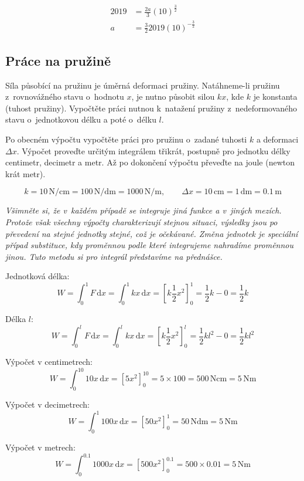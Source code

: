 $$\begin{aligned}
  2019&=\frac {2a}{3}(10)^{\frac 32}\\
  a&=\frac 32 2019 (10)^{-\frac 32}\end{aligned}$$

\konec

\stranka

\subsection{Práce na pružině} Síla působící na pružinu je úměrná
deformaci pružiny. Natáhneme-li pružinu z rovnovážného stavu o hodnotu
$x$, je nutno působit silou $kx$, kde $k$ je konstanta (tuhost
pružiny). Vypočtěte práci nutnou k natažení pružiny z nedeformovaného
stavu o jednotkovou délku a poté o délku $l$.

Po obecném výpočtu vypočtěte práci pro pružinu o zadané tuhosti $k$ a
deformaci $\Delta x$. Výpočet proveďte určitým integrálem třikrát,
postupně pro jednotku délky centimetr, decimetr a metr. Až po
dokončení výpočtu převeďte na joule (newton krát metr).

$$k=10 \,\mathrm{N}/\mathrm{cm}=100 \,\mathrm{N}/\mathrm{dm}=1000 \,\mathrm{N}/\mathrm{m}, \qquad \Delta x=10\,\mathrm{cm}=1\,\mathrm{dm}=0.1\,\mathrm{m}$$

\textit{Všimněte si, že v každém případě se integruje jiná funkce a v jiných
mezích. Protože však všechny výpočty charakterizují stejnou situaci,
výsledky jsou po převedení na stejné jednotky stejné, což je
očekávané. 
Změna jednotek je speciální případ substituce, kdy proměnnou podle
které integrujeme nahradíme proměnnou jinou. Tuto metodu si pro
integrál představíme na přednášce.
}

\reseni

Jednotková délka:
$$W=\int_0^1 F\,\mathrm dx = \int_0^1 kx\,\mathrm dx = \left[k\frac 12 x^2\right]_0^1=\frac 12 k-0=\frac 12 k$$

Délka $l$:
$$W=\int_0^l F\,\mathrm dx = \int_0^l kx\,\mathrm dx = \left[k\frac 12 x^2\right]_0^l=\frac 12 kl^2-0=\frac 12 kl^2$$

Výpočet v centimetrech:
$$W=\int_0^{10}  10 x\,\mathrm dx = \left[5 x^2\right]_0^{10}=5\times 100=500\,\mathrm N \mathrm{cm}=5\,\mathrm N\mathrm m$$


Výpočet v decimetrech:
$$W=\int_0^{1}  100 x\,\mathrm dx = \left[50 x^2\right]_0^{1}=50\,\mathrm N \mathrm{dm}=5\,\mathrm N\mathrm m$$

Výpočet v metrech:
$$W=\int_0^{0.1}  1000 x\,\mathrm dx = \left[500 x^2\right]_0^{0.1}=500\times 0.01=5\,\mathrm N \mathrm{m}$$


